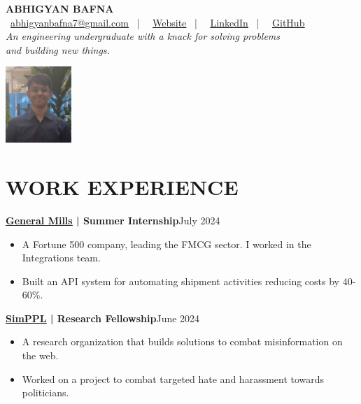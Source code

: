\documentclass[a4paper,11pt]{article}
\newcommand{\entry}[2]{
  \noindent\textbf{#1}\hfill{#2}\\[-1em]
}
\newcommand{\contactlink}[2]{
    \href{#1}{\color{cyan}\underline{#2}}
}
\newenvironment{itemizeWithPadding}{
  \begin{itemize}
}{
  \end{itemize}
  \vspace{0.5em} %
}
\begin{document}
\begin{minipage}{0.87\textwidth}
{\headingfont\textbf{\huge ABHIGYAN BAFNA}}\\[0.5em]
\faEnvelope\,\contactlink{mailto:abhigyanbafna7@gmail.com}{abhigyanbafna7@gmail.com} \ | \
\faGlobe\,\contactlink{https://abhigyan.tech}{Website} \ | \
\faLinkedinSquare\,\contactlink{https://www.linkedin.com/in/AbhigyanBafna}{LinkedIn} \ | \
\faGithub\,\contactlink{https://github.com/AbhigyanBafna}{GitHub}\\[0.5em]
\textit{An engineering undergraduate with a knack for solving problems\\and building new things.}
\end{minipage}
\hfill
\begin{minipage}{0.13\textwidth}
\includegraphics[width=2.5cm]{profilePicture.jpg}
\end{minipage}

\section*{WORK EXPERIENCE}

\entry{\contactlink{https://www.generalmills.co.in/}{General Mills} | Summer Internship}{July 2024}
\begin{itemizeWithPadding}
  \item A Fortune 500 company, leading the FMCG sector. I worked in the Integrations team.
  \item Built an API system for automating shipment activities reducing costs by 40-60\%.
\end{itemizeWithPadding}

\entry{\contactlink{https://simppl.org/}{SimPPL} | Research Fellowship}{June 2024}
\begin{itemizeWithPadding}
  \item A research organization that builds solutions to combat misinformation on the web.
  \item Worked on a project to combat targeted hate and harassment towards politicians.
\end{itemizeWithPadding}
\end{document}

